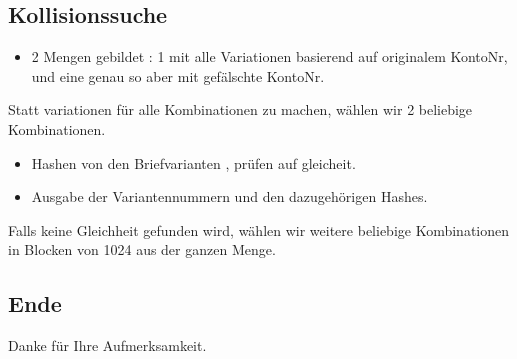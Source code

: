 \documentclass{beamer}
\begin{document}
\begin{frame}
\section{Kollisionssuche}
\begin{itemize}
 \item 2 Mengen gebildet : 1 mit alle Variationen basierend auf originalem KontoNr, und eine genau so aber mit gefälschte KontoNr.
\end{itemize}
\begin{block}{}
 Statt variationen für alle Kombinationen zu machen, wählen wir 2 beliebige Kombinationen.
\end{block}

\begin{itemize}
 \item Hashen von den Briefvarianten , prüfen auf gleicheit.
 \item Ausgabe der Variantennummern und den dazugehörigen Hashes.
\end{itemize}
\begin{block}{}
 Falls keine Gleichheit gefunden wird, wählen wir weitere beliebige Kombinationen in Blocken von 1024 aus der ganzen Menge.
\end{block}

\end{frame}
\begin{frame}
 \section*{Ende}
 \huge Danke für Ihre Aufmerksamkeit.
\end{frame}
\end{document}
